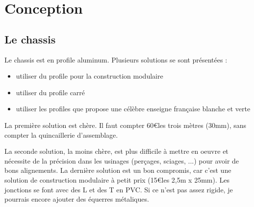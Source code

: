 \section{Conception}
\subsection{Le chassis}
Le chassis est en profile aluminum. Plusieurs solutions se sont %
présentées :\begin{itemize}%
\item{utiliser du profile pour la construction modulaire}%
\item{utiliser du profile carré}%
\item{utiliser les profiles que propose une célèbre enseigne française %
blanche et verte}
\end{itemize}%
La première solution est chère. Il faut compter 60\euro les trois mètres %
(30mm), sans compter la quincaillerie d'assemblage. \par%
La seconde solution, la moins chère, est plus difficile à mettre en %
oeuvre et nécessite de la précision dans les usinages (perçages, sciages, %
...) pour avoir de bons alignements.%
La dernière solution est un bon compromis, car c'est une solution de %
construction modulaire à petit prix (15\euro les 2,5m x 25mm). Les jonctions %
se font avec des L et des T en PVC. Si ce n'est pas assez rigide, je %
pourrais encore ajouter des équerres métaliques.